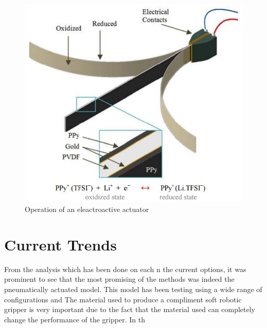 \documentclass[11pt,twocolumn]{article}
\begin{document}
\begin{figure}[h]
\centering
\includegraphics[scale=0.6]{electroactive}
\caption{Operation of an eleactroactive actuator}
\label{fig:electro1}
\end{figure}
\section{Current Trends }
From the analysis which has been done on each n the current options, it was prominent to see that the most promising of the methods was indeed the pneumatically actuated model. This model has been testing using a wide range of configurations and
The material used to produce a compliment soft robotic gripper is very important due to the fact that the material used can completely change the performance of the gripper. In th
\end{document}
